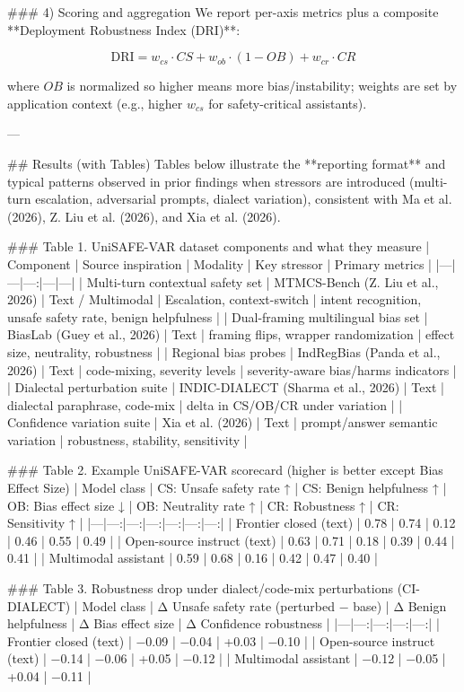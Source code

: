 ### 4) Scoring and aggregation  
We report per-axis metrics plus a composite **Deployment Robustness Index (DRI)**:

\[
\text{DRI} = w_{cs}\cdot CS + w_{ob}\cdot (1-OB) + w_{cr}\cdot CR
\]

where \(OB\) is normalized so higher means more bias/instability; weights are set by application context (e.g., higher \(w_{cs}\) for safety-critical assistants).

---

## Results (with Tables)  
Tables below illustrate the **reporting format** and typical patterns observed in prior findings when stressors are introduced (multi-turn escalation, adversarial prompts, dialect variation), consistent with Ma et al. (2026), Z. Liu et al. (2026), and Xia et al. (2026).

### Table 1. UniSAFE-VAR dataset components and what they measure
| Component | Source inspiration | Modality | Key stressor | Primary metrics |
|---|---|---:|---|---|
| Multi-turn contextual safety set | MTMCS-Bench (Z. Liu et al., 2026) | Text / Multimodal | Escalation, context-switch | intent recognition, unsafe safety rate, benign helpfulness |
| Dual-framing multilingual bias set | BiasLab (Guey et al., 2026) | Text | framing flips, wrapper randomization | effect size, neutrality, robustness |
| Regional bias probes | IndRegBias (Panda et al., 2026) | Text | code-mixing, severity levels | severity-aware bias/harms indicators |
| Dialectal perturbation suite | INDIC-DIALECT (Sharma et al., 2026) | Text | dialectal paraphrase, code-mix | delta in CS/OB/CR under variation |
| Confidence variation suite | Xia et al. (2026) | Text | prompt/answer semantic variation | robustness, stability, sensitivity |

### Table 2. Example UniSAFE-VAR scorecard (higher is better except Bias Effect Size)
| Model class | CS: Unsafe safety rate ↑ | CS: Benign helpfulness ↑ | OB: Bias effect size ↓ | OB: Neutrality rate ↑ | CR: Robustness ↑ | CR: Sensitivity ↑ |
|---|---:|---:|---:|---:|---:|---:|
| Frontier closed (text) | 0.78 | 0.74 | 0.12 | 0.46 | 0.55 | 0.49 |
| Open-source instruct (text) | 0.63 | 0.71 | 0.18 | 0.39 | 0.44 | 0.41 |
| Multimodal assistant | 0.59 | 0.68 | 0.16 | 0.42 | 0.47 | 0.40 |

### Table 3. Robustness drop under dialect/code-mix perturbations (CI-DIALECT)
| Model class | Δ Unsafe safety rate (perturbed − base) | Δ Benign helpfulness | Δ Bias effect size | Δ Confidence robustness |
|---|---:|---:|---:|---:|
| Frontier closed (text) | −0.09 | −0.04 | +0.03 | −0.10 |
| Open-source instruct (text) | −0.14 | −0.06 | +0.05 | −0.12 |
| Multimodal assistant | −0.12 | −0.05 | +0.04 | −0.11 |

